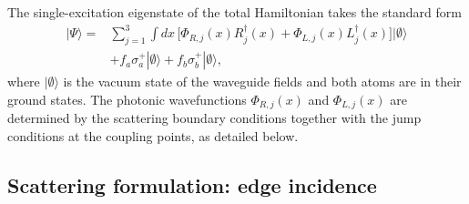 \documentclass[aps,pra,reprint,superscriptaddress,nofootinbib,longbibliography,floatfix]{revtex4-2}
\begin{document}
The single-excitation eigenstate of the total Hamiltonian takes the standard form
\begin{align}
|\Psi\rangle
=& \sum_{j=1}^3\int dx\,
\bigl[\Phi_{R,j}(x)R_j^\dagger(x)
+ \Phi_{L,j}(x)L_j^\dagger(x)\bigr]|\emptyset\rangle \nonumber\\
&+ f_a\sigma_a^+|\emptyset\rangle + f_b\sigma_b^+|\emptyset\rangle,
\label{eq:ansatz}
\end{align}
where $|\emptyset\rangle$ is the vacuum state of the waveguide fields and both atoms are in their ground states.
The photonic wavefunctions $\Phi_{R,j}(x)$ and $\Phi_{L,j}(x)$ are determined by the scattering boundary conditions together with the jump conditions at the coupling points, as detailed below.

\subsection{Scattering formulation: edge incidence}
\label{sec:edge}
\end{document}
